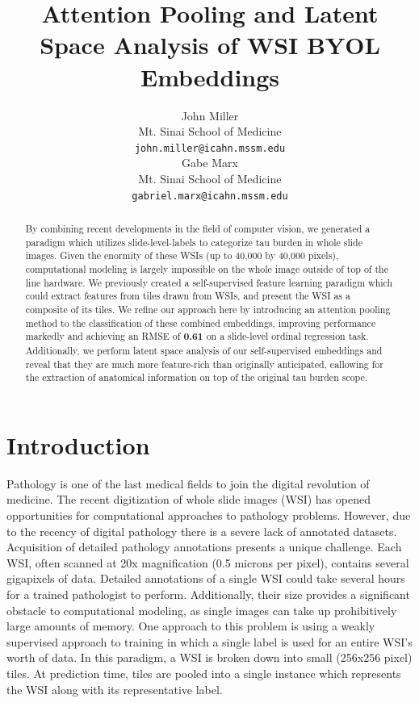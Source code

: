 \documentclass{article} %
\title{Attention Pooling and Latent Space Analysis of WSI BYOL Embeddings}
\author{
John Miller \\
Mt. Sinai School of Medicine\\
\texttt{john.miller@icahn.mssm.edu} \\
\And
Gabe Marx \\
Mt. Sinai School of Medicine \\
\texttt{gabriel.marx@icahn.mssm.edu} \\
}
\begin{document}
\maketitle

\begin{abstract}
By combining recent developments in the field of computer vision, we generated a paradigm which utilizes slide-level-labels to categorize tau burden in whole slide images. Given the enormity of these WSIs (up to 40,000 by 40,000 pixels), computational modeling is largely impossible on the whole image outside of top of the line hardware. We previously created a self-supervised feature learning paradigm which could extract features from tiles drawn from WSIs, and present the WSI as a composite of its tiles. We refine our approach here by introducing an attention pooling method to the classification of these combined embeddings, improving performance markedly and achieving an RMSE of \textbf{0.61} on a slide-level ordinal regression task. Additionally, we perform latent space analysis of our self-supervised embeddings and reveal that they are much more feature-rich than originally anticipated, eallowing for the extraction of anatomical information on top of the original tau burden scope.
\end{abstract}

\section{Introduction}

Pathology is one of the last medical fields to join the digital revolution of medicine. The recent digitization of whole slide images (WSI) has opened opportunities for computational approaches to pathology problems. However, due to the recency of digital pathology there is a severe lack of annotated datasets. Acquisition of detailed pathology annotations presents a unique challenge. Each WSI, often scanned at 20x magnification (0.5 microns per pixel), contains several gigapixels of data. Detailed annotations of a single WSI could take several hours for a trained pathologist to perform. Additionally, their size provides a significant obstacle to computational modeling, as single images can take up prohibitively large amounts of memory. One approach to this problem is using a weakly supervised approach to training in which a single label is used for an entire WSI’s worth of data. In this paradigm, a WSI is broken down into small (256x256 pixel) tiles. At prediction time, tiles are pooled into a single instance which represents the WSI along with its representative label. 
\end{document}
